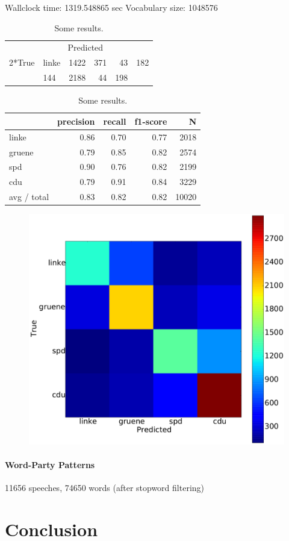 \documentclass{article} %
\begin{document}
Wallclock time: 1319.548865 sec
Vocabulary size: 1048576
%
\begin{table}[t]
\begin{center}
\begin{tabular}{clrrrr}
&   \multicolumn{4}{c}{Predicted}\\
{ 2}{*}{True} & linke & 1422 & 371 &  43&  182\\
 & 144& 2188  & 44 & 198\\
%
\end{tabular}
\end{center}
\caption{
\label{tab:results}
Some results.
}
\end{table}
\begin{table}[t]
\begin{center}
\begin{tabular}{lrrrr}
    &         precision    &recall &  f1-score  & N\\
\hline \hline
      linke     &  0.86    &  0.70  &    0.77   &   2018\\
     gruene   &    0.79    &  0.85   &   0.82 &     2574\\
        spd     &  0.90    &  0.76   &   0.82  &    2199\\
        cdu    &   0.79    &  0.91  &    0.84  &    3229\\
\hline
avg / total    &   0.83  &    0.82  &    0.82 &    10020\\
%
\end{tabular}
\end{center}
\caption{
\label{tab:results}
Some results.
}
\end{table}
%
%
\begin{figure}
\centering
\includegraphics[width=.4\textwidth]{conf_mat}
\caption{\label{fig:confusion_matrix}
\small
}
\end{figure}
%

\paragraph{Word-Party Patterns}
11656 speeches, 74650 words (after stopword filtering)

\section{Conclusion}

\small{

 
}
\end{document}

